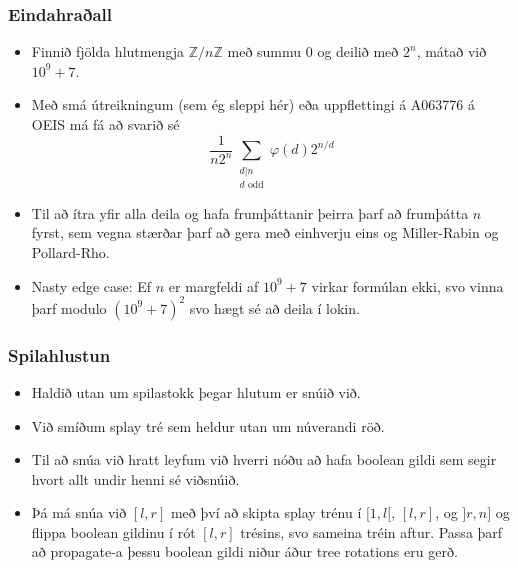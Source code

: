 \documentclass{beamer}
\begin{document}
\begin{frame}
\frametitle{Eindahraðall}

\begin{itemize}

\item Finnið fjölda hlutmengja $\mathbb{Z}/n\mathbb{Z}$ með summu $0$ og deilið með $2^n$, mátað við $10^9 + 7$.

\vspace*{0.25cm}

\item Með smá útreikningum (sem ég sleppi hér) eða uppflettingi á A063776 á OEIS má fá að svarið sé 
\[\frac{1}{n2^n} \sum_{\substack{d|n \\ d \text{ odd}}} \varphi(d) 2^{n/d}\]

\vspace*{0.25cm}

\item Til að ítra yfir alla deila og hafa frumþáttanir þeirra þarf að frumþátta $n$ fyrst, sem vegna stærðar þarf að gera með einhverju eins og Miller-Rabin og Pollard-Rho.

\vspace*{0.25cm}

\item Nasty edge case: Ef $n$ er margfeldi af $10^9 + 7$ virkar formúlan ekki, svo vinna þarf modulo $(10^9 + 7)^2$ svo hægt sé að deila í lokin.

\end{itemize}

\end{frame}

\begin{frame}
\frametitle{Spilahlustun}

\begin{itemize}

\item Haldið utan um spilastokk þegar hlutum er snúið við.

\vspace*{0.25cm}

\item Við smíðum splay tré sem heldur utan um núverandi röð.

\vspace*{0.25cm}

\item Til að snúa við hratt leyfum við hverri nóðu að hafa boolean gildi sem segir hvort allt undir henni sé viðsnúið.

\vspace*{0.25cm}

\item Þá má snúa við $[l, r]$ með því að skipta splay trénu í $[1, l[$, $[l, r]$, og $]r, n]$ og flippa boolean gildinu í rót $[l, r]$ trésins, svo sameina tréin aftur. Passa þarf að propagate-a þessu boolean gildi niður áður tree rotations eru gerð.

\end{itemize}

\end{frame}
\end{document}
